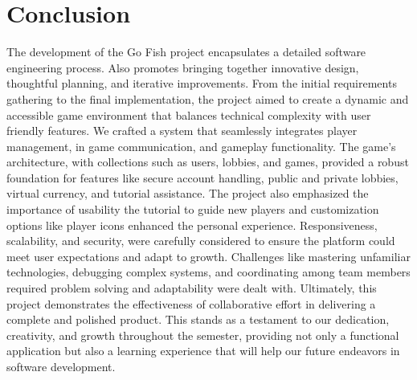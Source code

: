 \clearpage
\section{Conclusion}

The development of the Go Fish project encapsulates a detailed software engineering process. Also promotes bringing together innovative design, thoughtful planning, and iterative improvements. From the initial requirements gathering to the final implementation, the project aimed to create a dynamic and accessible game environment that balances technical complexity with user friendly features. We crafted a system that seamlessly integrates player management, in game communication, and gameplay functionality. The game's architecture, with collections such as users, lobbies, and games, provided a robust foundation for features like secure account handling, public and private lobbies, virtual currency, and tutorial assistance. The project also emphasized the importance of usability the tutorial to guide new players and customization options like player icons enhanced the personal experience. Responsiveness, scalability, and security, were carefully considered to ensure the platform could meet user expectations and adapt to growth. Challenges like mastering unfamiliar technologies, debugging complex systems, and coordinating among team members required problem solving and adaptability were dealt with. Ultimately, this project demonstrates the effectiveness of collaborative effort in delivering a complete and polished product. This stands as a testament to our dedication, creativity, and growth throughout the semester, providing not only a functional application but also a learning experience that will help our future endeavors in software development.
